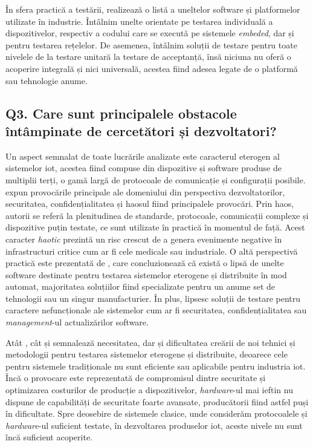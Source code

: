 În sfera practică a testării, \citet{Dias2018} realizează o listă a uneltelor software și platformelor utilizate în industrie. Întâlnim unelte orientate pe testarea individuală a dispozitivelor, respectiv a codului care se execută pe sistemele \textit{embeded}, dar și pentru testarea rețelelor. De asemenea, întâlnim soluții de testare pentru toate nivelele de la testare unitară la testare de acceptanță, însă niciuna nu oferă o acoperire integrală și nici universală, acestea fiind adesea legate de o platformă sau tehnologie anume. %

\subsection*{Q3. Care sunt principalele obstacole întâmpinate de cercetători și dezvoltatori?}

Un aspect semnalat de toate lucrările analizate este caracterul eterogen al sistemelor \acrshort{iot}, acestea fiind compuse din dispozitive și software produse de multiplii terți, o gamă largă de protocoale de comunicație și configurații posibile. \citet{Lee2015} expun provocările principale ale domeniului din perspectiva dezvoltatorilor, securitatea, confidențialitatea și haosul fiind principalele provocări. Prin haos, autorii se referă la plenitudinea de standarde, protocoale, comunicații complexe și dispozitive puțin testate, ce sunt utilizate în practică în momentul de față. Acest caracter \textit{haotic} prezintă un risc crescut de a genera evenimente negative în infrastructuri critice cum ar fi cele medicale sau industriale. O altă perspectivă practică este prezentată de \citet{Dias2018}, care concluzionează că există o lipsă de unelte software destinate pentru testarea sistemelor eterogene și distribuite în mod automat, majoritatea soluțiilor fiind specializate pentru un anume set de tehnologii sau un singur manufacturier. În plus, lipsesc soluții de testare pentru caractere nefuncționale ale sistemelor cum ar fi securitatea, confidențialitatea sau \textit{management}-ul actualizărilor software.

Atât \citet{Corts2019}, cât și \citet{Ahmed2019} semnalează necesitatea, dar și dificultatea creării de noi tehnici și metodologii pentru testarea sistemelor eterogene și distribuite, deoarece cele pentru sistemele tradiționale nu sunt eficiente sau aplicabile pentru industria \acrshort{iot}. Încă o provocare este reprezentată de compromisul dintre securitate și optimizarea costurilor de producție a dispozitivelor, \textit{hardware}-ul mai ieftin nu dispune de capabilități de securitate foarte avansate, producătorii fiind astfel puși în dificultate. Spre deosebire de sistemele clasice, unde considerăm protocoalele și \textit{hardware}-ul suficient testate, în dezvoltarea produselor \acrshort{iot}, aceste nivele nu sunt încă suficient acoperite.

